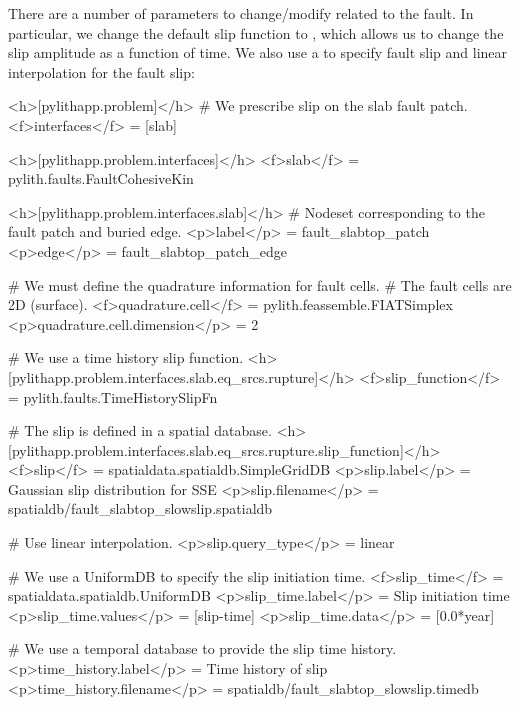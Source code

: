 There are a number of parameters to change/modify related to the
fault. In particular, we change the default slip function to
, which allows us to change
the slip amplitude as a function of time. We also use a
 to specify fault slip and linear interpolation
for the fault slip:
\begin{cfg}
<h>[pylithapp.problem]</h>
# We prescribe slip on the slab fault patch.
<f>interfaces</f> = [slab]

<h>[pylithapp.problem.interfaces]</h>
<f>slab</f> = pylith.faults.FaultCohesiveKin

<h>[pylithapp.problem.interfaces.slab]</h>
# Nodeset corresponding to the fault patch and buried edge.
<p>label</p> = fault_slabtop_patch
<p>edge</p> = fault_slabtop_patch_edge

# We must define the quadrature information for fault cells.
# The fault cells are 2D (surface).
<f>quadrature.cell</f> = pylith.feassemble.FIATSimplex
<p>quadrature.cell.dimension</p> = 2

# We use a time history slip function.
<h>[pylithapp.problem.interfaces.slab.eq_srcs.rupture]</h>
<f>slip_function</f> = pylith.faults.TimeHistorySlipFn

# The slip is defined in a spatial database.
<h>[pylithapp.problem.interfaces.slab.eq_srcs.rupture.slip_function]</h>
<f>slip</f> = spatialdata.spatialdb.SimpleGridDB
<p>slip.label</p> = Gaussian slip distribution for SSE
<p>slip.filename</p> = spatialdb/fault_slabtop_slowslip.spatialdb

# Use linear interpolation.
<p>slip.query_type</p> = linear

# We use a UniformDB to specify the slip initiation time.
<f>slip_time</f> = spatialdata.spatialdb.UniformDB
<p>slip_time.label</p> = Slip initiation time
<p>slip_time.values</p> = [slip-time]
<p>slip_time.data</p> = [0.0*year] 

# We use a temporal database to provide the slip time history.
<p>time_history.label</p> = Time history of slip
<p>time_history.filename</p> = spatialdb/fault_slabtop_slowslip.timedb
\end{cfg}

